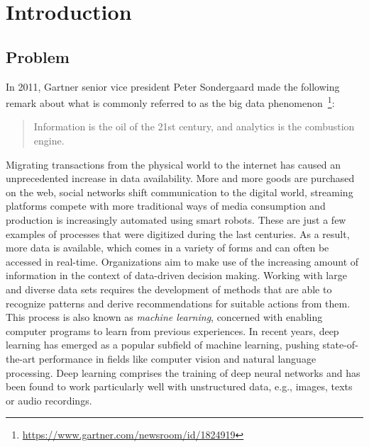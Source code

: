 \section{Introduction}

\subsection{Problem}
\label{sec:problem}

In 2011, Gartner senior vice president Peter Sondergaard made the following remark
about what is commonly referred to as the big data phenomenon~\footnote{\url{https://www.gartner.com/newsroom/id/1824919}}:

\begin{quote}
  Information is the oil of the 21st century, and analytics is the combustion engine.
\end{quote}

Migrating transactions from the physical world to the internet has caused an unprecedented
increase in data availability.
More and more goods are purchased on the web, social networks shift communication
to the digital world, streaming platforms compete with more traditional ways
of media consumption and production is increasingly automated using smart robots.
These are just a few examples of processes that were digitized during the last
centuries.
As a result, more data is available, which comes in a variety of forms and
can often be accessed in real-time.
Organizations aim to make use of the increasing amount of information in the
context of data-driven decision making.
Working with large and diverse data sets requires the development of methods
that are able to recognize patterns and derive recommendations for suitable
actions from them.
This process is also known as \textit{machine learning}, concerned with
enabling computer programs to learn from previous experiences.
In recent years, deep learning has emerged as a popular subfield of machine
learning, pushing state-of-the-art performance in fields like computer vision and
natural language processing.
Deep learning comprises the training of deep neural networks and has been found 
to work particularly well with unstructured data, e.g., images, texts or audio 
recordings.

